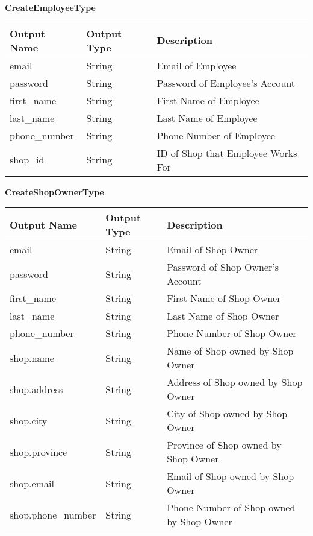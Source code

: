 \documentclass[12pt, titlepage]{article}
\begin{document}
\textbf{CreateEmployeeType}

\begin{table}[H]
	\begin{tabular}{|l|l|l|}
		\hline
		\textbf{Output Name} & \textbf{Output Type} & \textbf{Description}               \\
		\hline
		email                & String               & Email of Employee                  \\
		\hline
		password             & String               & Password of Employee's Account     \\
		\hline
		first\_name          & String               & First Name of Employee             \\
		\hline
		last\_name           & String               & Last Name of Employee              \\
		\hline
		phone\_number        & String               & Phone Number of Employee           \\
		\hline
		shop\_id             & String               & ID of Shop that Employee Works For \\
		\hline
	\end{tabular}
\end{table}

\textbf{CreateShopOwnerType}

\begin{table}[H]
	\begin{tabular}{|l|l|l|}
		\hline
		\textbf{Output Name} & \textbf{Output Type} & \textbf{Description}                     \\
		\hline
		email                & String               & Email of Shop Owner                      \\
		\hline
		password             & String               & Password of Shop Owner's Account         \\
		\hline
		first\_name          & String               & First Name of Shop Owner                 \\
		\hline
		last\_name           & String               & Last Name of Shop Owner                  \\
		\hline
		phone\_number        & String               & Phone Number of Shop Owner               \\
		\hline
		shop.name            & String               & Name of Shop owned by Shop Owner         \\
		\hline
		shop.address         & String               & Address of Shop owned by Shop Owner      \\
		\hline
		shop.city            & String               & City of Shop owned by Shop Owner         \\
		\hline
		shop.province        & String               & Province of Shop owned by Shop Owner     \\
		\hline
		shop.email           & String               & Email of Shop owned by Shop Owner        \\
		\hline
		shop.phone\_number   & String               & Phone Number of Shop owned by Shop Owner \\
		\hline
	\end{tabular}
\end{table}
\end{document}
